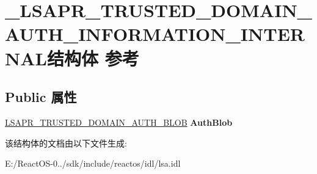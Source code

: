 \hypertarget{struct___l_s_a_p_r___t_r_u_s_t_e_d___d_o_m_a_i_n___a_u_t_h___i_n_f_o_r_m_a_t_i_o_n___i_n_t_e_r_n_a_l}{}\section{\+\_\+\+L\+S\+A\+P\+R\+\_\+\+T\+R\+U\+S\+T\+E\+D\+\_\+\+D\+O\+M\+A\+I\+N\+\_\+\+A\+U\+T\+H\+\_\+\+I\+N\+F\+O\+R\+M\+A\+T\+I\+O\+N\+\_\+\+I\+N\+T\+E\+R\+N\+A\+L结构体 参考}
\label{struct___l_s_a_p_r___t_r_u_s_t_e_d___d_o_m_a_i_n___a_u_t_h___i_n_f_o_r_m_a_t_i_o_n___i_n_t_e_r_n_a_l}
\subsection*{Public 属性}
\begin{DoxyCompactItemize}
\item 
\mbox{\label{struct___l_s_a_p_r___t_r_u_s_t_e_d___d_o_m_a_i_n___a_u_t_h___i_n_f_o_r_m_a_t_i_o_n___i_n_t_e_r_n_a_l_abbe4923e641528213dd3f84166c3fac8}} 
\hyperlink{struct___l_s_a_p_r___t_r_u_s_t_e_d___d_o_m_a_i_n___a_u_t_h___b_l_o_b}{L\+S\+A\+P\+R\+\_\+\+T\+R\+U\+S\+T\+E\+D\+\_\+\+D\+O\+M\+A\+I\+N\+\_\+\+A\+U\+T\+H\+\_\+\+B\+L\+OB} {\bfseries Auth\+Blob}
\end{DoxyCompactItemize}


该结构体的文档由以下文件生成\+:\begin{DoxyCompactItemize}
\item 
E\+:/\+React\+O\+S-\/0../sdk/include/reactos/idl/lsa.\+idl\end{DoxyCompactItemize}
